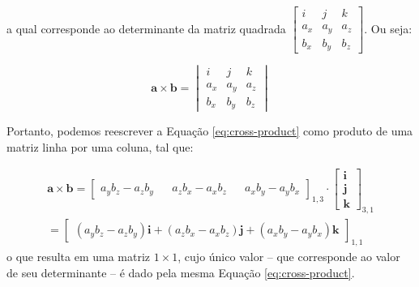 \documentclass[a4paper,11pt,pagenumber=true]{article}
\theoremstyle{mytheor}
\begin{document}
            a qual corresponde ao determinante da matriz quadrada 
            \(  \begin{bmatrix}
                    i       & j     & k     \\
                    a_x     & a_y   & a_z   \\
                    b_x     & b_y   & b_z 
                \end{bmatrix}
            \). Ou seja:
            
            \begin{equation}\label{eq:cross-detmat}
                \mathbf{a}\times\mathbf{b} = 
                \begin{vmatrix}
                    i       & j     & k     \\
                    a_x     & a_y   & a_z   \\
                    b_x     & b_y   & b_z 
                \end{vmatrix}                
            \end{equation}
            
            Portanto, podemos reescrever a Equação \ref{eq:cross-product} como produto de uma matriz linha por uma coluna, tal que: 
            
            \begin{equation}\label{cross-matrix}
                \begin{split}
                    \mathbf{a}\times\mathbf{b} = 
                    \begin{bmatrix}
                        a_y b_z - a_z b_y   && a_z b_x - a_x b_z    && a_x b_y - a_y b_x
                    \end{bmatrix}_{1,3} \cdot 
                    \begin{bmatrix}
                        \mathbf{i} \\ 
                        \mathbf{j} \\ 
                        \mathbf{k}
                    \end{bmatrix}_{3,1} \\ =
                    \begin{bmatrix}
                        (a_y b_z - a_z b_y)\mathbf{i} +
                        (a_z b_x - a_x b_z)\mathbf{j} +
                        (a_x b_y - a_y b_x)\mathbf{k}
                    \end{bmatrix}_{1,1}
                \end{split}
            \end{equation}
            o que resulta em uma matriz $1\times1$, cujo único valor -- que corresponde ao valor de seu
            determinante -- é dado pela mesma Equação \ref{eq:cross-product}.
\end{document}
